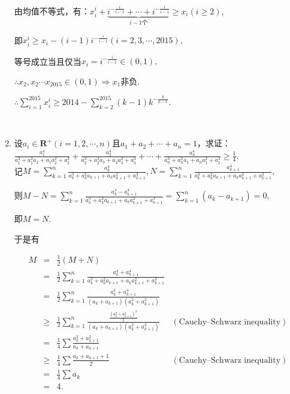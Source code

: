 \documentclass[8pt]{article}
\begin{document}
\begin{enumerate}
			由均值不等式，有：$\displaystyle x_i^i+\underbrace{i^{-\frac{i}{i-1}}+\cdots+i^{-\frac{i}{i-1}}}_{i-1\text{个}}\geq x_i (i \geq 2)$,

			即$\displaystyle x_i^i\geq x_i-(i-1)i^{-\frac{i}{i-1}} (i = 2, 3, \cdots, 2015),$

			等号成立当且仅当$x_i=i^{-\frac{i}{i-1}}\in(0, 1),$

			$\therefore x_2, x_2 \cdots x_2015\in(0, 1) \Rightarrow x_1$非负.

			$\therefore \displaystyle \sum_{i=1}^{2015}{x_i^i}\geq 2014-\sum_{k=2}^{2015}(k-1)k^{-\frac{k}{k-1}}.$

		~\\

		\item 设$a_i\in\mathbf{R}^{+} (i = 1, 2, \cdots, n)$且$a_1+a_2+\cdots+a_n=1$，求证：$\displaystyle \frac{a_1^4}{a_1^3+a_1^2a_2+a_1a_2^2+a_2^3}+\frac{a_2^4}{a_2^3+a_2^2a_3+a_2a_3^2+a_3^3}+\cdots+\frac{a_n^4}{a_n^3+a_n^2a_1+a_na_1^2+a_1^3}\geq\frac{1}{4}.$
			~\\

			记$\displaystyle M=\sum_{k=1}^{n}\frac{a_k^4}{a_k^3+a_k^2 a_{k+1} +a_k a_{k+1}^2 + a_{k+1}^3}, N=\sum_{k=1}^{n}\frac{a_{k+1}^4}{a_k^3+a_k^2 a_{k+1} + a_k a_{k+1}^2 + a_{k+1}^3},$

			则$M-N=\displaystyle \sum_{k=1}^{n}\frac{a_k^4-a_{k+1}^4}{a_k^3+a_k^2 a_{k+1} + a_k a_{k+1}^2 + a_{k+1}^3}=\sum_{k=1}^{n}\left(a_k-a_{k+1}\right)=0,$

			即$M=N$.

			于是有

			$$
			\begin{array}{rclr}
			M&=&\displaystyle\frac{1}{2}(M+N)\\
			&=&\displaystyle\frac{1}{2}\sum_{k=1}^{n}\frac{a_k^4+a_{k+1}^4}{a_k^3+a_k^2 a_{k+1} + a_k a_{k+1}^2 + a_{k+1}^3}\\
			&=&\displaystyle\frac{1}{2}\sum_{k=1}^{n}\frac{a_k^4+a_{k+1}^4}{(a_k+a_{k+1})(a_k^2+a_{k+1}^2)}\\
			&\geq&\displaystyle\frac{1}{2}\sum_{k=1}^{n}\frac{\frac{(a_k^2+a_{k+1}^2)^2}{2}}{(a_k+a_{k+1})(a_k^2+a_{k+1}^2)}&(\text{Cauchy–Schwarz inequality})\\
			&=&\displaystyle\frac{1}{4}\sum\frac{a_k^2+a_{k+1}^2}{a_k+a_{k+1}}\\
			&\geq&\displaystyle\frac{1}{4}\sum\frac{a_k+a_{k+1}+1}{2}&(\text{Cauchy–Schwarz inequality})\\
			&=&\frac{1}{4}\sum a_k\\
			&=&4.\\
			\end{array}
			$$


\end{enumerate}
\end{document}
